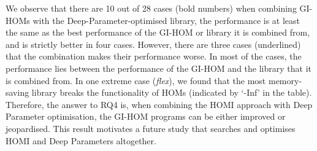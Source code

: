 \documentclass[oribibl]{llncs}
\begin{document}
{%

We observe that there are 10 out of 28 cases (bold numbers) when combining GI-HOMs with the Deep-Parameter-optimised library, the performance is at least the same as the best performance of the GI-HOM or library it is combined from, and is strictly better in four cases.
However, there are three cases (underlined) that the combination makes their performance worse.
In most of the cases, the performance lies between the performance of the GI-HOM and the library that it is combined from.
In one extreme case (\emph{flex}), we found that the most memory-saving library breaks the functionality of HOMs (indicated by `-Inf' in the table). Therefore, the answer to RQ4 is, when combining the HOMI approach with Deep Parameter optimisation, the GI-HOM programs can be either improved or jeopardised. This result motivates a future study that searches and optimises HOMI and Deep Parameters altogether.

}
\end{document}
